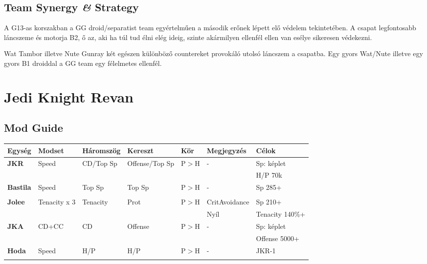 \documentclass[11pt]{report}
\begin{document}
\section{Team Synergy \textit{\&} Strategy}
A G13-as korszakban a GG droid/separatist team egyértelműen a második erőnek lépett elő védelem tekintetében. A csapat legfontosabb láncszeme és motorja B2, ő az, aki ha túl tud élni elég ideig, szinte akármilyen ellenfél ellen van esélye sikeresen védekezni.\par
Wat Tambor illetve Nute Gunray két egészen különböző countereket provokáló utolsó láncszem a csapatba. Egy gyors Wat/Nute illetve egy gyors B1 droiddal a GG team egy félelmetes ellenfél.


\chapter{Jedi Knight Revan}
\section{Mod Guide}
\begin{center}
    \begin{tabular}{|l | l | l | l | l | l | l |}
        \hline
        Egység & Modset & Háromszög & Kereszt & Kör & Megjegyzés & Célok\\ \hline
        \textbf{JKR} & Speed & CD/Top Sp & Offense/Top Sp & P$>$H & - & Sp: képlet\\ 
        &  &  &  &  &  & H/P 70k\\ \hline
        \textbf{Bastila} & Speed & Top Sp & Top Sp & P$>$H & - & Sp 285+\\
        &  &  &  &  &  & \\ \hline        
        \textbf{Jolee} & Tenacity x 3 & Tenacity & Prot & P$>$H & CritAvoidance & Sp 210+\\
        &  &  &  &  & Nyíl & Tenacity 140\%+\\ \hline
        \textbf{JKA} & CD+CC & CD & Offense & P$>$H & - & Sp: képlet\\
        &  &  &  &  &  & Offense 5000+\\ \hline
        \textbf{Hoda} & Speed & H/P & H/P & P$>$H & - & JKR-1\\
        &  &  &  &  &  &  \\ \hline
    \end{tabular}
\end{center}
\end{document}
